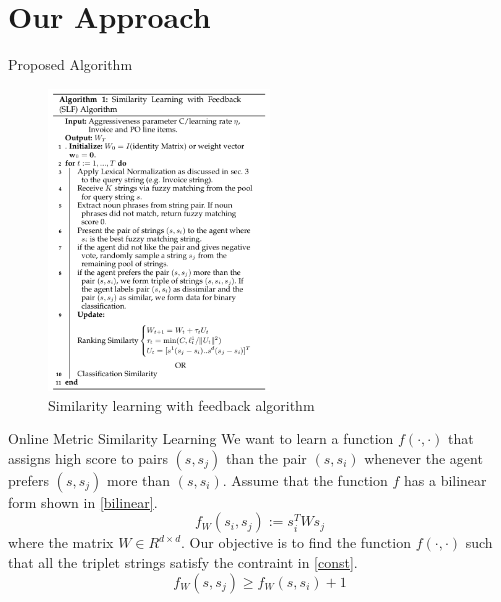 \documentclass[blue]{beamer}
\begin{document}
\section{Our Approach}

\begin{frame}{Proposed Algorithm}

\begin{figure}
\centering
\includegraphics[height=8cm]{algo.png}
\caption{Similarity learning with feedback algorithm}
\label{fig:algo}
\end{figure}
\end{frame}

\begin{frame}{Online Metric Similarity Learning}
We want to learn a function $f(\cdot, \cdot)$ that assigns high score to pairs $(s, s_j)$ than the pair $(s, s_i)$ whenever the agent prefers $(s, s_j)$ more than $(s, s_i)$. Assume that the function $f$ has a bilinear form shown in \eqref{bilinear}.
    \begin{equation}\label{bilinear}
        f_W(s_i, s_j) := s_i^TWs_j
    \end{equation}
    where the matrix $W \in R^{d\times d}$. 
Our objective is to find the function $f(\cdot,\cdot)$  such that all the triplet strings satisfy the contraint in \eqref{const}.
    \begin{equation}\label{const}
        f_W(s,s_j) \geq f_W(s,s_i) +1
    \end{equation}
\end{frame}
\end{document}
